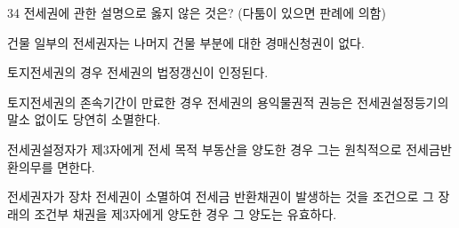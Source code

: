 \begin{question}{34}
전세권에 관한 설명으로 옳지 않은 것은? (다툼이 있으면 판례에 의함)
\begin{choices}
  \item 건물 일부의 전세권자는 나머지 건물 부분에 대한 경매신청권이 없다.
  \item 토지전세권의 경우 전세권의 법정갱신이 인정된다.
  \item 토지전세권의 존속기간이 만료한 경우 전세권의 용익물권적 권능은 전세권설정등기의 말소 없이도 당연히 소멸한다.
  \item 전세권설정자가 제3자에게 전세 목적 부동산을 양도한 경우 그는 원칙적으로 전세금반환의무를 면한다.
  \item 전세권자가 장차 전세권이 소멸하여 전세금 반환채권이 발생하는 것을 조건으로 그 장래의 조건부 채권을 제3자에게 양도한 경우 그 양도는 유효하다.
\end{choices}
\end{question}
